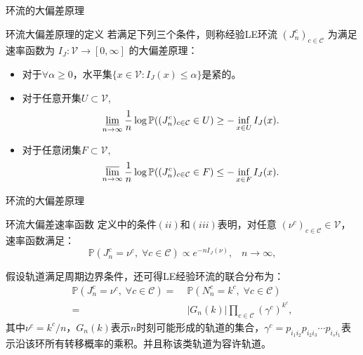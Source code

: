 \documentclass{beamer}
\begin{document}
\begin{frame}{环流的大偏差原理}
	\begin{block}{环流大偏差原理的定义}
		若满足下列三个条件，则称经验LE环流 $(J_n^c)_{c \in \mathcal{C}}$ 为满足速率函数为 $I_J:\mathcal{V}\rightarrow [0,\infty]$ 的大偏差原理：
		\begin{itemize}
			\item 对于$\forall \alpha \geqslant 0$，水平集$\{x \in \mathcal{V}: I_{J}(x) \leqslant \alpha\}$是紧的。
			\item 对于任意开集$U \subset \mathcal{V}$,
			      \begin{equation*}\label{def1}
				      \varliminf_{n\to\infty}\frac{1}{n}\log\mathbb{P}((J^c_n)_{c\in\mathcal{C}}\in U)\ge-\inf_{x\in U}I_J(x).
			      \end{equation*}
			\item 对于任意闭集$F \subset \mathcal{V}$,
			      \begin{equation*}\label{def2}
				      \varlimsup_{n\to \infty}\frac{1}{n}\log\mathbb{P}((J^c_n)_{c\in\mathcal{C}}\in F)\le -\inf_{x\in F}I_J(x).
			      \end{equation*}
		\end{itemize}
	\end{block}
\end{frame}

\begin{frame}{环流的大偏差原理}
	\begin{block}{环流大偏差速率函数}
		定义中的条件$(ii)$和$(iii)$表明，对任意 $(\nu^c)_{c\in\mathcal{C}}\in\mathcal{V}$，速率函数满足：
		\begin{equation*}\label{LDP}
			\mathbb{P}(J^c_n=\nu^c,\;\forall c\in\mathcal{C})\propto e^{-n I_J(\nu)},\;\;\;n\to\infty,
		\end{equation*}

		假设轨道满足周期边界条件，还可得LE经验环流的联合分布为：
		\begin{equation*}\label{joint}
			\begin{split}
				\mathbb{P}\left(J^c_n=\nu^c,\;\forall c\in\mathcal{C}\right)
				=&\;\mathbb{P}\left(N^c_n=k^c,\;\forall c\in\mathcal{C}\right)\\
				=&\;|G_n(k)|\prod_{c\in\mathcal{C}}\left(\gamma^c\right)^{k^c},
			\end{split}
		\end{equation*}
		其中$\nu^c = k^c/n$，$G_n(k)$表示$n$时刻可能形成的轨道的集合，$\gamma^c = p_{i_1i_2}p_{i_2i_3}\cdots p_{i_si_1}$表示沿该环所有转移概率的乘积。并且称该类轨道为容许轨道。
	\end{block}
\end{frame}
\end{document}
